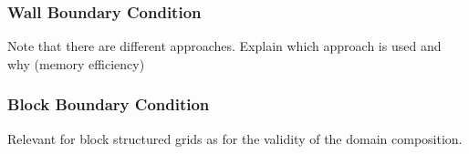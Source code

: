 
      \subsubsection{Wall Boundary Condition}

      Note that there are different approaches. Explain which approach is used and why (memory efficiency)

      \subsubsection{Block Boundary Condition}

      Relevant for block structured grids as for the validity of the domain composition.
      

